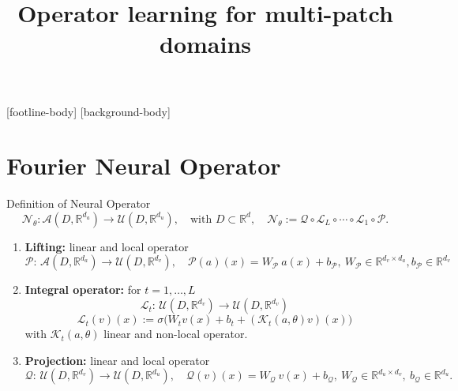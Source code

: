 \documentclass{beamer}
\title{Operator learning  \newline  for multi-patch domains}
\subtitle{}
\institute{{\inst{1}Departement of Mathematics, \newline University of Pavia}}
\newcommand{\numberset}{\mathbb}
\newcommand{\R}{\numberset{R}}
\begin{document}
\frame{\titlepage}

\addtocounter{framenumber}{-1}
[footline-body]
[background-body]


\section{Fourier Neural Operator}


\begin{frame}[t]{Definition of Neural Operator}
	\vspace{-0.5cm}
	\[ \mathcal{N}_{\theta} :\mathcal{A}(D, \R^{d_a}) \to \mathcal{U}(D, \R^{d_{u}}), \quad \text{with } D \subset \R^d, \quad	\mathcal{N}_{\theta} := \mathcal{Q} \circ \mathcal{L}_L \circ \cdots \circ \mathcal{L}_1 \circ \mathcal{P} . \]
	\vspace{-0.2cm}
	\begin{enumerate}
		\item \textbf{Lifting:} linear and local operator
		      \[\mathcal{P}:\, \mathcal{A}(D, \R^{d_a}) \to \mathcal{U}(D, \R^{d_{v}}), \quad  \mathcal{P}(a)(x) = W_{\mathcal{P}}\ a(x) + b_{\mathcal{P}}, \ W_{\mathcal{P}} \in \R^{d_{v} \times d_a}, b_{\mathcal{P}} \in \R^{d_v}\]
		      \vspace{-0.2cm}
		      \pause
		\item \textbf{Integral operator:} for $ t = 1, \dots, L $
		      \[ \mathcal{L}_t : \, \mathcal{U}(D, \R^{d_{v}}) \to  \mathcal{U}(D, \R^{d_{v}}) \]
		      \[  \mathcal{L}_t(v)(x) := \sigma\Big( W_t v(x)+ b_t + (\mathcal{K}_t(a, \theta) v)(x) \Big) \]
		      with $ \mathcal{K}_t(a, \theta) $ linear and non-local operator.  
		      \pause
		\item \textbf{Projection:} linear and local operator
		      \[\mathcal{Q}:\, \mathcal{U}(D, \R^{d_{v}}) \to  \mathcal{U}(D, \R^{d_{u}}), \quad  \mathcal{Q}(v)(x) = W_{\mathcal{Q}}\ v(x) + b_{\mathcal{Q}}, \ W_{\mathcal{Q}} \in \R^{d_{u} \times d_{v}}, \ b_{\mathcal{Q}}\in \R^{d_u}. \]
	\end{enumerate}
\end{frame}

\end{document}
